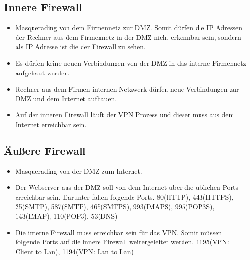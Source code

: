 \subsection{Innere Firewall}
\begin{itemize}
\item Masquerading von dem Firmennetz zur DMZ. Somit dürfen die IP Adressen der Rechner aus dem Firmennetz in der DMZ nicht erkennbar sein, sondern als IP Adresse ist die der Firewall zu sehen.
\item Es dürfen keine neuen Verbindungen von der DMZ in das interne Firmennetz aufgebaut werden.
\item Rechner aus dem Firmen internen Netzwerk dürfen neue Verbindungen zur DMZ und dem Internet aufbauen.
\item Auf der inneren Firewall läuft der VPN Prozess und dieser muss aus dem Internet erreichbar sein.	
\end{itemize}

\subsection{Äußere Firewall}
\begin{itemize}
\item Masquerading von der DMZ zum Internet.
\item Der Webserver aus der DMZ soll von dem Internet über die üblichen Ports erreichbar sein. Darunter fallen folgende Ports. 80(HTTP), 443(HTTPS), 25(SMTP), 587(SMTP), 465(SMTPS), 993(IMAPS), 995(POP3S), 143(IMAP), 110(POP3), 53(DNS)
\item Die interne Firewall muss erreichbar sein für das VPN. Somit müssen folgende Ports auf die innere Firewall weitergeleitet werden. 1195(VPN: Client to Lan), 1194(VPN: Lan to Lan)
\end{itemize}




